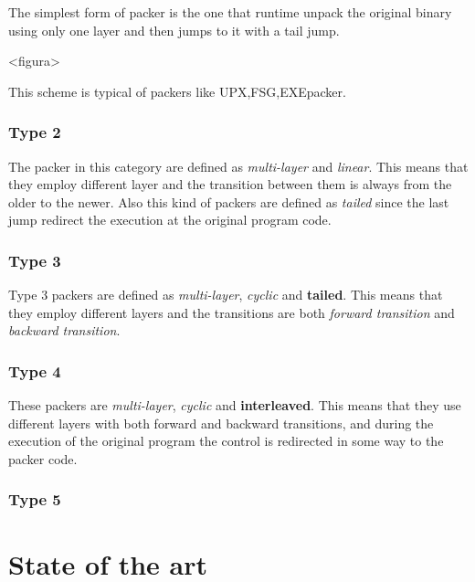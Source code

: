 The simplest form of packer is the one that runtime unpack the original binary using only one layer and then jumps to it with a tail jump. 

<figura>

This scheme is typical of packers like UPX,FSG,EXEpacker.

\subsubsection{Type 2}

The packer in this category are defined as \textit{multi-layer} and \textit{linear}. This means that they employ different layer and the transition between them is always from the older to the newer. Also this kind of packers are defined as \textit{tailed} since the last jump redirect the execution at the original program code.

\subsubsection{Type 3}

Type 3 packers are defined as \textit{multi-layer}, \textit{cyclic} and \textbf{tailed}. This means that they employ different layers and the transitions are both \textit{forward transition} and \textit{backward transition}. 

\subsubsection{Type 4}

These packers are \textit{multi-layer}, \textit{cyclic} and \textbf{interleaved}. This means that they use different layers with both forward and backward transitions, and during the execution of the original program the control is redirected in some way to the packer code.

\subsubsection{Type 5}

\section{State of the art}
